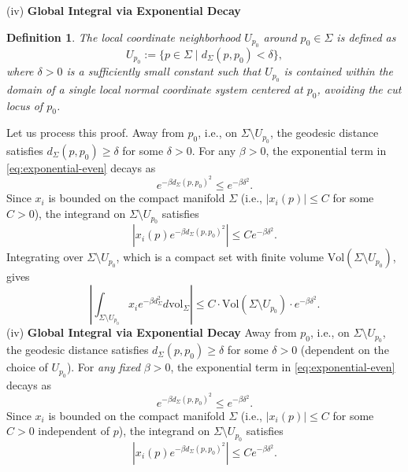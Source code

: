 \documentclass[a4, 12pt]{amsart}
\numberwithin{equation}{section} \numberwithin{equation}{section}
\newtheorem{defn}[thm]{Definition}
\begin{document}
(iv) \textbf{Global Integral via Exponential Decay}
\begin{defn}\label{def:up0}
The local coordinate neighborhood $ U_{p_0} $ around $ p_0 \in \Sigma $ is defined as
\begin{equation*}
U_{p_0} := \{ p \in \Sigma \mid d_{\Sigma}(p, p_0) < \delta \},
\end{equation*}
where $ \delta > 0 $ is a sufficiently small constant such that $ U_{p_0} $ is contained within the domain of a single local normal coordinate system centered at $ p_0 $, avoiding the cut locus of $ p_0 $.
\end{defn}
Let us process this proof. Away from $p_0$, i.e., on $\Sigma \setminus U_{p_0}$, the geodesic distance satisfies $d_{\Sigma}(p, p_0) \geq \delta$ for some $\delta > 0$. For any $\beta > 0$, the exponential term in \eqref{eq:exponential-even} decays as
\begin{equation*}
e^{-\beta d_{\Sigma}(p, p_0)^2} \leq e^{-\beta \delta^2}.
\end{equation*}
Since $x_i$ is bounded on the compact manifold $\Sigma$ (i.e., $|x_i(p)| \leq C$ for some $C > 0$), the integrand on $\Sigma \setminus U_{p_0}$ satisfies
\begin{equation*}
|x_i(p) e^{-\beta d_{\Sigma}(p, p_0)^2}| \leq C e^{-\beta \delta^2}.
\end{equation*}
Integrating over $\Sigma \setminus U_{p_0}$, which is a compact set with finite volume $\text{Vol}(\Sigma \setminus U_{p_0})$, gives
\begin{equation}\label{eq:global-decay}
\left| \int_{\Sigma \setminus U_{p_0}} x_i e^{-\beta d_{\Sigma}^2} d\mathrm{vol}_{\Sigma} \right| \leq C \cdot \text{Vol}(\Sigma \setminus U_{p_0}) \cdot e^{-\beta \delta^2}.
\end{equation}
(iv) \textbf{Global Integral via Exponential Decay}
Away from $p_0$, i.e., on $\Sigma \setminus U_{p_0}$, the geodesic distance satisfies $d_{\Sigma}(p, p_0) \geq \delta$ for some $\delta > 0$ (dependent on the choice of $U_{p_0}$). For \textit{any fixed} $\beta > 0$, the exponential term in \eqref{eq:exponential-even} decays as
\begin{equation*}
e^{-\beta d_{\Sigma}(p, p_0)^2} \leq e^{-\beta \delta^2}.
\end{equation*}
Since $x_i$ is bounded on the compact manifold $\Sigma$ (i.e., $|x_i(p)| \leq C$ for some $C > 0$ independent of $p$), the integrand on $\Sigma \setminus U_{p_0}$ satisfies
\begin{equation*}
|x_i(p) e^{-\beta d_{\Sigma}(p, p_0)^2}| \leq C e^{-\beta \delta^2}.
\end{equation*}
\end{document}

